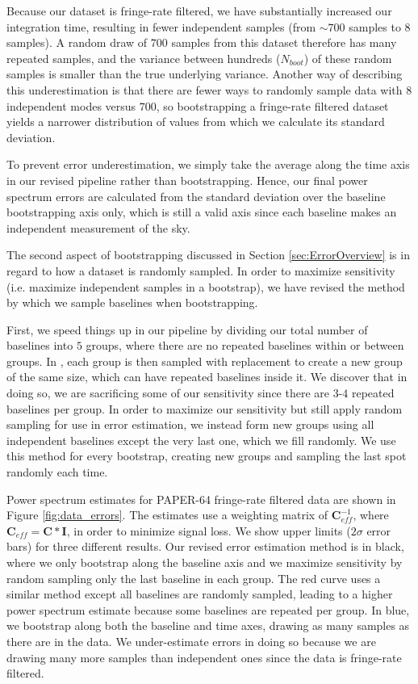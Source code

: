 \documentclass[preprint2,numberedappendix,tighten,twocolappendix]{aastex6}  %
\begin{document}
Because our dataset is fringe-rate filtered, we have substantially increased our integration time, resulting in fewer independent samples (from $\sim700$ samples to $8$ samples). A random draw of $700$ samples from this dataset therefore has many repeated samples, and the variance between hundreds ($N_{boot}$) of these random samples is smaller than the true underlying variance. Another way of describing this underestimation is that there are fewer ways to randomly sample data with $8$ independent modes versus $700$, so bootstrapping a fringe-rate filtered dataset yields a narrower distribution of values from which we calculate its standard deviation.

To prevent error underestimation, we simply take the average along the time axis in our revised pipeline rather than bootstrapping. Hence, our final power spectrum errors are calculated from the standard deviation over the baseline bootstrapping axis only, which is still a valid axis since each baseline makes an independent measurement of the sky.

The second aspect of bootstrapping discussed in Section \ref{sec:ErrorOverview} is in regard to how a dataset is randomly sampled. In order to maximize sensitivity (i.e. maximize independent samples in a bootstrap), we have revised the method by which we sample baselines when bootstrapping. 

First, we speed things up in our pipeline by dividing our total number of baselines into $5$ groups, where there are no repeated baselines within or between groups. In \citet{ali_et_al2015}, each group is then sampled with replacement to create a new group of the same size, which can have repeated baselines inside it. We discover that in doing so, we are sacrificing some of our sensitivity since there are $3$-$4$ repeated baselines per group. In order to maximize our sensitivity but still apply random sampling for use in error estimation, we instead form new groups using all independent baselines except the very last one, which we fill randomly. We use this method for every bootstrap, creating new groups and sampling the last spot randomly each time.

Power spectrum estimates for PAPER-64 fringe-rate filtered data are shown in Figure \ref{fig:data_errors}. The estimates use a weighting matrix of $\textbf{C}_{eff}^{-1}$, where $\textbf{C}_{eff} = \textbf{C}*\textbf{I}$, in order to minimize signal loss. We show upper limits ($2\sigma$ error bars) for three different results. Our revised error estimation method is in black, where we only bootstrap along the baseline axis and we maximize sensitivity by random sampling only the last baseline in each group. The red curve uses a similar method except all baselines are randomly sampled, leading to a higher power spectrum estimate because some baselines are repeated per group. In blue, we bootstrap along both the baseline and time axes, drawing as many samples as there are in the data. We under-estimate errors in doing so because we are drawing many more samples than independent ones since the data is fringe-rate filtered.
\end{document}

